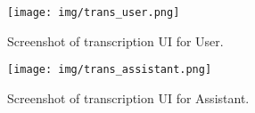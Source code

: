\documentclass[11pt,a4paper]{article}
\begin{document}
\begin{figure}[t]
\centering    
\texttt{[image: img/trans\_user.png]}
    \caption{Screenshot of transcription UI for User.}
\label{fig:user}
\vspace{-3mm}
\end{figure}

    

\begin{figure}[t]
\centering    
\texttt{[image: img/trans\_assistant.png]}
    \caption{Screenshot of transcription UI for Assistant.}
\label{fig:assistant}
\vspace{-3mm}
\end{figure}
\end{document}
